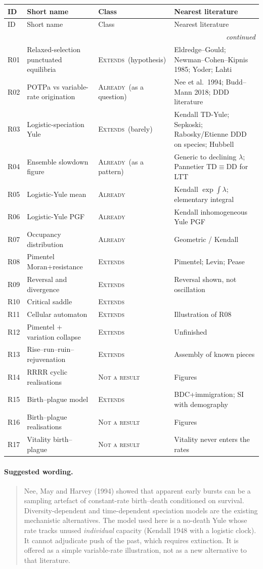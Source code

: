 \documentclass[11pt,a4paper]{report}
\newcommand{\cls}[1]{\textsc{#1}}
\newcommand{\ext}{\cls{Extends}}
\newcommand{\alr}{\cls{Already}}
\newcommand{\nar}{\cls{Not a result}}
\newcommand{\itemhead}{%
  \toprule
  ID & Short name & Class & Nearest literature \\
  \midrule
  \endfirsthead
  \toprule
  ID & Short name & Class & Nearest literature \\
  \midrule
  \endhead
  \midrule
  \multicolumn{4}{r}{\footnotesize\itshape continued} \\
  \endfoot
  \bottomrule
  \endlastfoot
}
\newcommand{\itemtable}{\begin{longtable}{L{1.55cm}L{4.35cm}L{2.35cm}L{6.55cm}}}
\begin{document}
\itemtable
\itemhead
R01 & Relaxed-selection punctuated equilibria & \ext\ (hypothesis) &
Eldredge--Gould; Newman--Cohen--Kipnis 1985; Yoder; Lahti \\
R02 & POTPa vs variable-rate origination & \alr\ (as a question) &
Nee et al.\ 1994; Budd--Mann 2018; DDD literature \\
R03 & Logistic-speciation Yule & \ext\ (barely) &
Kendall TD-Yule; Sepkoski; Rabosky/Etienne DDD on species; Hubbell \\
R04 & Ensemble slowdown figure & \alr\ (as a pattern) &
Generic to declining \(\lambda\); Pannetier TD\(\equiv\)DD for LTT \\
R05 & Logistic-Yule mean & \alr &
Kendall \(\exp\int\lambda\); elementary integral \\
R06 & Logistic-Yule PGF & \alr & Kendall inhomogeneous Yule PGF \\
R07 & Occupancy distribution & \alr & Geometric / Kendall \\
R08 & Pimentel Moran+resistance & \ext & Pimentel; Levin; Pease \\
R09 & Reversal and divergence & \ext & Reversal shown, not oscillation \\
R10 & Critical saddle & \ext & \\
R11 & Cellular automaton & \ext & Illustration of R08 \\
R12 & Pimentel + variation collapse & \ext & Unfinished \\
R13 & Rise--run--ruin--rejuvenation & \ext & Assembly of known pieces \\
R14 & RRRR cyclic realisations & \nar & Figures \\
R15 & Birth--plague model & \ext & BDC+immigration; SI with demography \\
R16 & Birth--plague realisations & \nar & Figures \\
R17 & Vitality birth--plague & \nar & Vitality never enters the rates \\
\end{longtable}

\paragraph{Suggested wording.}
\begin{quote}
Nee, May and Harvey (1994) showed that apparent early bursts can be a
sampling artefact of constant-rate birth--death conditioned on survival.
Diversity-dependent and time-dependent speciation models are the existing
mechanistic alternatives. The model used here is a no-death Yule whose
rate tracks unused \emph{individual} capacity (Kendall 1948 with a
logistic clock). It cannot adjudicate push of the past, which requires
extinction. It is offered as a simple variable-rate illustration, not as
a new alternative to that literature.
\end{quote}
\end{document}
